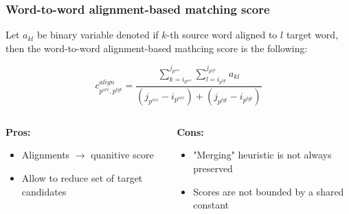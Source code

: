 \documentclass{beamer}
\newcommand{\src}[1]{#1^{src}}
\newcommand{\tgt}[1]{#1^{tgt}}
\begin{document}
\begin{frame}
  \frametitle{Word-to-word alignment-based matching score}

  Let \( a_{kl} \) be binary variable denoted if \( k \)-th source word aligned to \( l \) target word,
  then the word-to-word alignment-based mathcing score is the following:

  \begin{equation*}
    c_{\src{p}, \tgt{p}}^{align} =
    \frac{\sum\limits_{k=i_{\src{p}}}^{j_{\src{p}}} \sum\limits_{l=i_{\tgt{p}}}^{j_{\tgt{p}}} a_{kl}}
    {(j_{\src{p}} - i_{\src{p}}) + (j_{\tgt{p}} - i_{\tgt{p}})}
  \end{equation*}

  \vspace*{0.2cm}
  \begin{columns}
    \begin{column}[t]{.5\textwidth}
      \centering \textbf{Pros:}
      \begin{itemize}
        \item Alignments \( \rightarrow \) quanitive score
        \item Allow to reduce set of target candidates
      \end{itemize}
    \end{column}
    \begin{column}[t]{.5\textwidth}
      \centering \textbf{Cons:}
      \begin{itemize}
        \item "Merging" heuristic is not always preserved
        \item Scores are not bounded by a shared constant
      \end{itemize}
    \end{column}
  \end{columns}
\end{frame}
\end{document}
